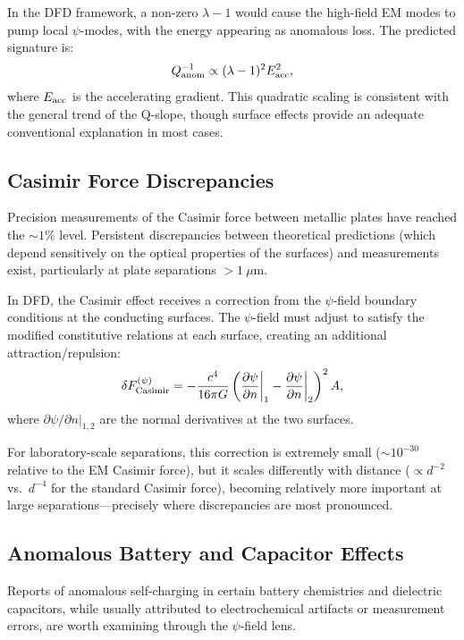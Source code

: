 \documentclass[aps,prd,twocolumn,showpacs,preprintnumbers,superscriptaddress,nofootinbib]{revtex4-2}
\begin{document}
In the DFD framework, a non-zero $\lambda - 1$ would cause the high-field
EM modes to pump local $\psi$-modes, with the energy appearing as anomalous
loss.  The predicted signature is:
\begin{equation}
Q_{\rm anom}^{-1} \propto (\lambda-1)^2 E_{\rm acc}^2,
\end{equation}
where $E_{\rm acc}$ is the accelerating gradient.  This quadratic scaling
is consistent with the general trend of the Q-slope, though surface
effects provide an adequate conventional explanation in most cases.

\subsection{Casimir Force Discrepancies}\label{sec:casimir}

Precision measurements of the Casimir force between metallic plates have
reached the $\sim 1\%$ level.  Persistent discrepancies between
theoretical predictions (which depend sensitively on the optical
properties of the surfaces) and measurements exist, particularly at
plate separations $> 1~\mu$m.

In DFD, the Casimir effect receives a correction from the $\psi$-field
boundary conditions at the conducting surfaces.  The $\psi$-field must
adjust to satisfy the modified constitutive relations at each surface,
creating an additional attraction/repulsion:
\begin{equation}
\delta F_{\rm Casimir}^{(\psi)} = -\frac{c^4}{16\pi G}\left(\frac{\partial\psi}{\partial n}\bigg|_1 - \frac{\partial\psi}{\partial n}\bigg|_2\right)^2 A,
\end{equation}
where $\partial\psi/\partial n|_{1,2}$ are the normal derivatives at the
two surfaces.

For laboratory-scale separations, this correction is extremely small
($\sim 10^{-30}$ relative to the EM Casimir force), but it scales
differently with distance ($\propto d^{-2}$ vs.\ $d^{-4}$ for the
standard Casimir force), becoming relatively more important at large
separations---precisely where discrepancies are most pronounced.

\subsection{Anomalous Battery and Capacitor Effects}\label{sec:battery}

Reports of anomalous self-charging in certain battery chemistries and
dielectric capacitors, while usually attributed to electrochemical
artifacts or measurement errors, are worth examining through the
$\psi$-field lens.
\end{document}
